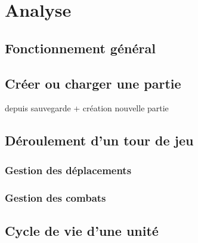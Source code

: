 \section{Analyse}

\subsection{Fonctionnement général}

\subsection{Créer ou charger une partie}
depuis sauvegarde + création nouvelle partie

\subsection{Déroulement d'un tour de jeu}
\subsubsection{Gestion des déplacements}
\subsubsection{Gestion des combats}

\subsection{Cycle de vie d'une unité}
